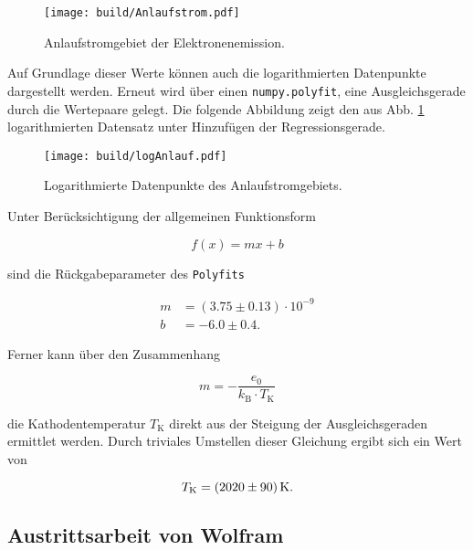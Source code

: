\begin{figure}[H]
    \centering 
    \texttt{[image: build/Anlaufstrom.pdf]}
    \caption{Anlaufstromgebiet der Elektronenemission.}
    \label{fig:Kennlinien2}
\end{figure}

\noindent Auf Grundlage dieser Werte können auch die logarithmierten Datenpunkte dargestellt werden. Erneut wird über einen \texttt{numpy.polyfit},
eine Ausgleichsgerade durch die Wertepaare gelegt. Die folgende Abbildung zeigt den aus Abb. \ref{fig:Kennlinien2} logarithmierten Datensatz unter 
Hinzufügen der Regressionsgerade.

\begin{figure}[H]
    \centering 
    \texttt{[image: build/logAnlauf.pdf]}
    \caption{Logarithmierte Datenpunkte des Anlaufstromgebiets.}
    \label{fig:Anlaufstromgebiet}
\end{figure}

\noindent Unter Berücksichtigung der allgemeinen Funktionsform 

\begin{equation*}
    f(x) = mx + b 
\end{equation*}

\noindent sind die Rückgabeparameter des \texttt{Polyfits}

\begin{align*}
    m &= \left(3.75\pm{}0.13\right)\cdot{}10^{-9}\\
    b &= -6.0\pm{}0.4.
\end{align*}

\noindent Ferner kann über den Zusammenhang 

\begin{equation*}
    m = -\frac{e_0}{k_\text{B}\cdot{}T_\text{K}}
\end{equation*}

\noindent die Kathodentemperatur $T_\text{K}$ direkt aus der Steigung der Ausgleichsgeraden ermittlet werden. Durch triviales Umstellen 
dieser Gleichung ergibt sich ein Wert von 

\begin{equation*}
    T_\text{K} = \qty{2020\pm90}{\kelvin}.
\end{equation*}

\subsection{Austrittsarbeit von Wolfram}
\label{sec:Austrittsarbeit}

